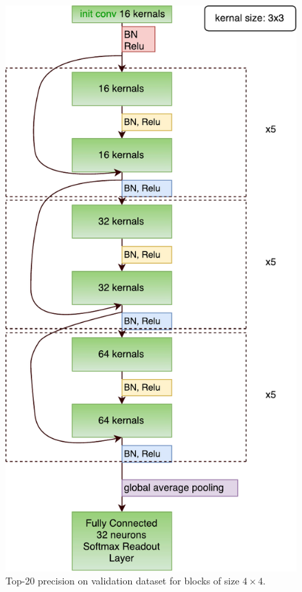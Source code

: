 \begin{figure}
    \centering
    \includegraphics[width=\textwidth,height=\textheight,keepaspectratio]{Figures/our-neural-net-structure.pdf}
    \caption[Top-20 precision on validation dataset for blocks of size \(4\times4\)]{
        Top-20 precision on validation dataset for blocks of size \(4\times4\).
        }\label{fig:our-architecture}
\end{figure}

